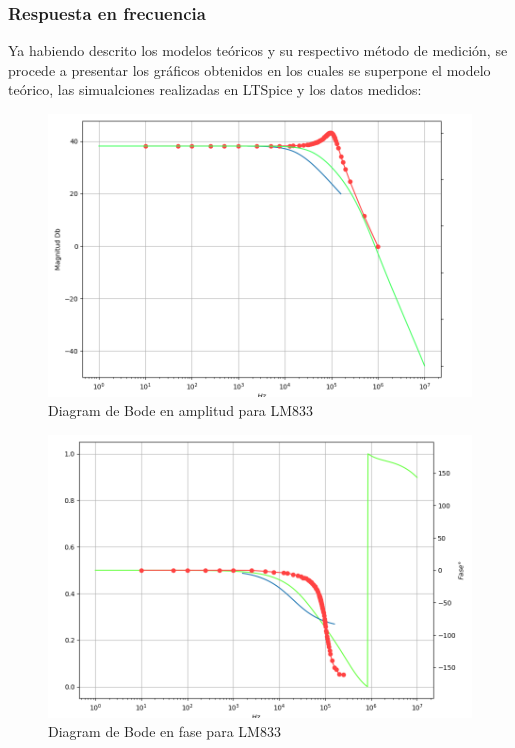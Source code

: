 \subsubsection{Respuesta en frecuencia}

Ya habiendo descrito los modelos teóricos y su respectivo método de medición, se procede a presentar los gráficos obtenidos en los cuales se superpone el modelo teórico, las simualciones realizadas en LTSpice y los datos medidos:



\begin{figure}[H]	
	\centering
	\includegraphics[width=\textwidth]{Ejercicio2/Imagenes/Bode_Amp_LM833.png}
	\caption{Diagram de Bode en amplitud para LM833}
	\label{fig:bode_amp_LM833}
\end{figure}

\begin{figure}[H]	
	\centering
	\includegraphics[width=\textwidth]{Ejercicio2/Imagenes/Bode_Fase_LM833.png}
	\caption{Diagram de Bode en fase para LM833}
	\label{fig:bode_fase_LM833}
\end{figure}

